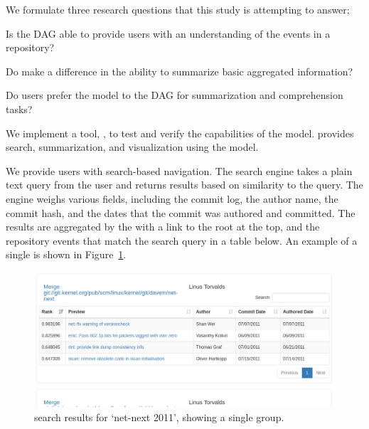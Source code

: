 We formulate three research questions that this study is attempting to
answer;

\begin{RQ}
  \item

    Is the DAG able to provide users with an understanding of the events
    in a repository?

  \item

    Do \mt make a difference in the ability to summarize basic
    aggregated information?

  \item

    Do users prefer the \mt model to the DAG for summarization and
    comprehension tasks?

\end{RQ}


We implement a tool, \tool, to test and verify the capabilities of the
\mt model. \tool provides search, summarization, and
visualization using the \mt model.

We provide users with search-based navigation. The search engine takes a
plain text query from the user and returns results based on similarity
to the query. The engine weighs various fields, including the commit
log, the author name, the commit hash, and the dates that the commit was
authored and committed. The results are aggregated by the \mt
with a link to the root at the top, and the repository events that match
the search query in a table below.  An example of a single \mt is shown
in Figure~\ref{fig:linvis_search_results}.

\begin{figure}[htpb]
  \centering
  \includegraphics[width=1.0\linewidth]{figures/linvis/search_results.png}
  \caption{\tool search results for `net-next 2011', showing a single
    \mt group.}
  \label{fig:linvis_search_results}
\end{figure}


